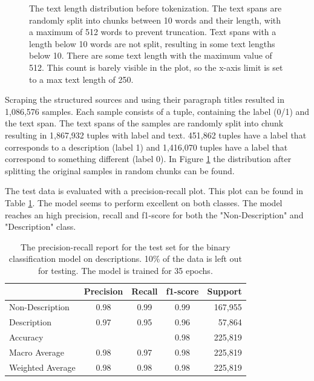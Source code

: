 \documentclass[a4paper, 12pt, oneside]{book} %
\begin{document}
\begin{figure} [t]
    \centering
    \vspace{0cm}
    \makebox[\textwidth][c]{}
    \caption{The text length distribution before tokenization. The text spans are randomly split into chunks between 10 words and their length, with a maximum of 512 words to prevent truncation. Text spans with a length below 10 words are not split, resulting in some text lengths below 10. There are some text length with the maximum value of 512. This count is barely visible in the plot, so the x-axis limit is set to a max text length of 250.}
    \label{fig:text_length_distribution}
\end{figure}

Scraping the structured sources and using their paragraph titles resulted in 1,086,576 samples.
Each sample consists of a tuple, containing the label (0/1) and the text span.
The text spans of the samples are randomly split into chunk resulting in 1,867,932 tuples with label and text.
451,862 tuples have a label that corresponds to a description (label 1) and 1,416,070 tuples have a label that correspond to something different (label 0).
In Figure \ref{fig:text_length_distribution} the distribution after splitting the original samples in random chunks can be found.

The test data is evaluated with a precision-recall plot.
This plot can be found in Table \ref{tab:precision_recall_descriptionsmodel}.
The model seems to perform excellent on both classes.
The model reaches an high precision, recall and f1-score for both the "Non-Description" and "Description" class.

\begin{table}[h]
\centering
\caption{The precision-recall report for the test set for the binary classification model on descriptions. 10\% of the data is left out for testing. The model is trained for 35 epochs.}
\label{tab:precision_recall_descriptionsmodel}
\begin{tabular}{@{}lcccr@{}}
\cmidrule(l){2-5}
 & \multicolumn{1}{l}{Precision} & \multicolumn{1}{l}{Recall} & \multicolumn{1}{l}{f1-score} & \multicolumn{1}{l}{Support} \\ \midrule
Non-Description  & 0.98 & 0.99 & 0.99 & 167,955 \\
Description      & 0.97 & 0.95 & 0.96 & 57,864  \\ \midrule
Accuracy         &      &      & 0.98 & 225,819 \\
Macro Average    & 0.98 & 0.97 & 0.98 & 225,819 \\
Weighted Average & 0.98 & 0.98 & 0.98 & 225,819 \\ \bottomrule
\end{tabular}
\end{table}
\end{document}
